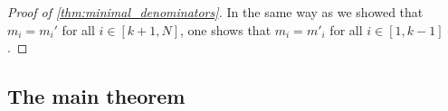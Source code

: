 \begin{proof}[Proof of \cref{thm:minimal_denominators}]
	In the same way as we showed that $m_i = m_i'$ for all $i \in [k+1, N]$, one shows that
	$m_i = m'_i$ for all $i \in [1, k-1]$.
\end{proof}

\subsection{The main theorem}







